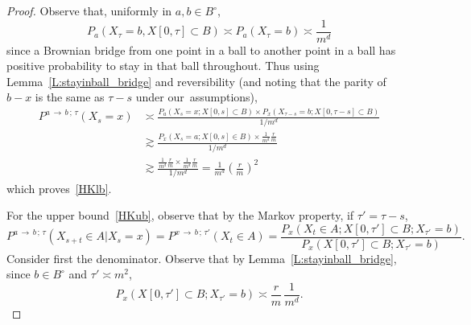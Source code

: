 \documentclass[10pt]{amsart}
\theoremstyle{definition}\newtheorem{defi}[theo]{Definition}\newtheorem{rema}[theo]{Remark}\newtheorem{exam}[theo]{Example}\newtheorem{exem}[theo]{Example}\newtheorem{nota}[theo]{Notation}
\newcommand{\Pmh}{P}
\begin{document}
\begin{proof}
Observe that, uniformly in $a, b \in B^\circ$,
\[
\Pmh_a(X_\tau = b, X[0,\tau] \subset B) \asymp \Pmh_a(X_\tau = b) \asymp \frac1{m^d}
\]
since a Brownian bridge from one point in a ball to another point in a ball has positive probability to stay in that ball throughout. Thus using Lemma~\ref{L:stayinball_bridge} and reversibility (and noting that the parity of $b - x$ is the same as $\tau -s$ under our~assumptions),
\begin{align*}
\Pmh^{a\,\to\,b\,;\,\tau} (X_s = x) &\asymp \frac{\Pmh_a (X_s = x; X[0, s] \subset B) \times \Pmh_x (X_{\tau - s} = b ; X[0, \tau - s] \subset B)}{1/m^d}\\
& \gtrsim \frac{\Pmh_x (X_s = a; X[0,s] \in B) \times \tfrac{1}{m^d} \tfrac{r}{m}}{1/m^d}\\
& \gtrsim \frac{\tfrac{1}{m^d}{ \tfrac{r}{m} \times \tfrac{1}{m^d} \tfrac{r}{m}}}{1/m^d} = \tfrac{1}{m^d} \left(\tfrac{r}{m}\right)^2
\end{align*}
which proves~\eqref{HKlb}.

For the upper bound~\eqref{HKub}, observe that by the Markov property, if $\tau' = \tau -s $,
\[
\Pmh^{a\,\to\,b\,;\,\tau}(X_{s+t} \in A |X_s=x)\! =\!\Pmh^{x\,\to\,b\,;\,\tau'} (X_t \in A) = \frac{\Pmh_x(X_t \in A ; X[0, \tau'] \subset B ; X_{\tau'} = b)}{\Pmh_x (X[0, \tau'] \subset B; X_{\tau'} = b)}.
\]
Consider first the denominator. Observe that by Lemma~\ref{L:stayinball_bridge}, since $b \in B^\circ$ and $\tau'\asymp m^2$,
\[
\Pmh_x (X[0, \tau'] \subset B; X_{\tau'} = b) \asymp \frac{r}{m}\,\frac1{m^d}.
\]



\end{proof}
\end{document}
